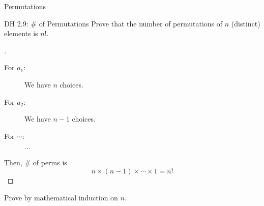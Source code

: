 \begin{frame}{}
  \begin{center}
    {\LARGE Permutations} \\[1.00cm]

    \pause
    \begin{description}
      \centering
      \item[\Large Generating All Permutations]
	\vspace{0.30cm}
      \item[\Large Stackable/Queueable Permutations]
    \end{description}
  \end{center}
\end{frame}

\begin{frame}{}
  \begin{description}
    \centering
    \item[\Large Generating All Permutations]
  \end{description}
\end{frame}

\begin{frame}{}
  \begin{exampleblock}{DH 2.9: \# of Permutations}
    Prove that the number of permutations of $n$ (distinct) elements is $n!$.
  \end{exampleblock}

  \pause
  \begin{proof}[]
    \begin{description}
      \item[For $a_1$:] We have $n$ choices.
      \item[For $a_2$:] We have $n-1$ choices.
      \item[For $\cdots$:] $\cdots$
    \end{description}
    Then, \# of perms is 
    \[
      n \times (n-1) \times \cdots \times 1 = n!
    \]
  \end{proof}

  \vspace{0.60cm}
  \pause
  \centerline{\Large Prove by mathematical induction on $n$.}
\end{frame}

